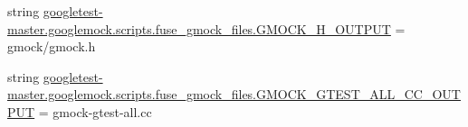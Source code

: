 \begin{DoxyCompactItemize}
\item 
string \mbox{\hyperlink{namespacegoogletest-master_1_1googlemock_1_1scripts_1_1fuse__gmock__files_a03c1391301f8b00e5151f4b588316d58}{googletest-\/master.\+googlemock.\+scripts.\+fuse\+\_\+gmock\+\_\+files.\+G\+M\+O\+C\+K\+\_\+\+H\+\_\+\+O\+U\+T\+P\+UT}} = \textquotesingle{}gmock/gmock.\+h\textquotesingle{}
\item 
string \mbox{\hyperlink{namespacegoogletest-master_1_1googlemock_1_1scripts_1_1fuse__gmock__files_ac03694809f9f5b413052f54d7412fbcb}{googletest-\/master.\+googlemock.\+scripts.\+fuse\+\_\+gmock\+\_\+files.\+G\+M\+O\+C\+K\+\_\+\+G\+T\+E\+S\+T\+\_\+\+A\+L\+L\+\_\+\+C\+C\+\_\+\+O\+U\+T\+P\+UT}} = \textquotesingle{}gmock-\/gtest-\/all.\+cc\textquotesingle{}
\end{DoxyCompactItemize}
